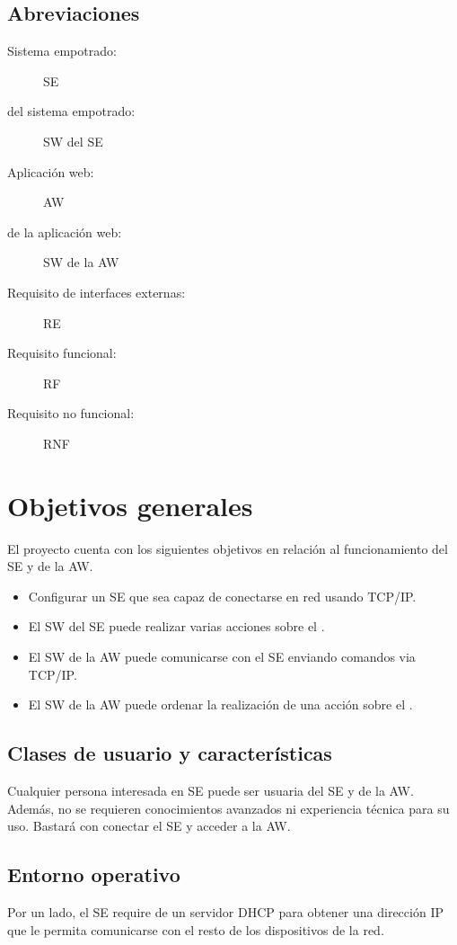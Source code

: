 \subsection{Abreviaciones} \label{sec:spec-abreviaciones}
\begin{description}
  \item[Sistema empotrado:] SE
  \item[ del sistema empotrado:] SW del SE
  \item[Aplicación web:] AW
  \item[ de la aplicación web:] SW de la AW
  \item[Requisito de interfaces externas:] RE 
  \item[Requisito funcional:] RF
  \item[Requisito no funcional:] RNF
\end{description}

\section{Objetivos generales}
El proyecto cuenta con los siguientes objetivos en relación al funcionamiento
del SE y de la AW.

\begin{itemize}
  \item Configurar un SE que sea capaz de conectarse en red usando TCP/IP.
  \item El SW del SE puede realizar varias acciones sobre el
        .
  \item El SW de la AW puede comunicarse con el SE enviando comandos via TCP/IP.
  \item El SW de la AW puede ordenar la realización de una acción sobre el
        .
\end{itemize}

\subsection{Clases de usuario y características} \label{sec:spec-usuarios}
Cualquier persona interesada en SE puede ser usuaria del SE y de la AW.
Además, no se requieren conocimientos avanzados ni experiencia técnica
para su uso. Bastará con conectar el SE y acceder a la AW.

\subsection{Entorno operativo} \label{sec:spec-entorno}
Por un lado, el SE require de un servidor DHCP para obtener una dirección IP
que le permita comunicarse con el resto de los dispositivos de la red.

